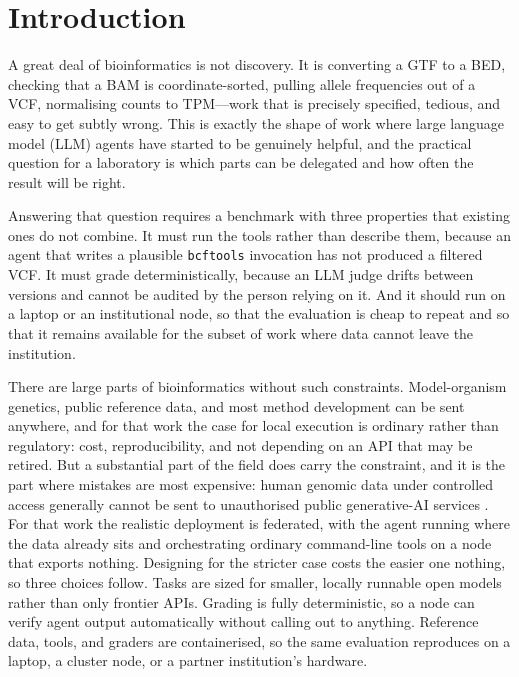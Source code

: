 \documentclass[11pt]{article}
\begin{document}
\section{Introduction}

A great deal of bioinformatics is not discovery.
It is converting a GTF to a BED, checking that a BAM is coordinate-sorted, pulling allele frequencies out of a VCF, normalising counts to TPM---work that is precisely specified, tedious, and easy to get subtly wrong.
This is exactly the shape of work where large language model (LLM) agents have started to be genuinely helpful, and the practical question for a laboratory is which parts can be delegated and how often the result will be right.

Answering that question requires a benchmark with three properties that existing ones do not combine.
It must run the tools rather than describe them, because an agent that writes a plausible \texttt{bcftools} invocation has not produced a filtered VCF.
It must grade deterministically, because an LLM judge drifts between versions and cannot be audited by the person relying on it.
And it should run on a laptop or an institutional node, so that the evaluation is cheap to repeat and so that it remains available for the subset of work where data cannot leave the institution.

There are large parts of bioinformatics without such constraints.
Model-organism genetics, public reference data, and most method development can be sent anywhere, and for that work the case for local execution is ordinary rather than regulatory: cost, reproducibility, and not depending on an API that may be retired.
But a substantial part of the field does carry the constraint, and it is the part where mistakes are most expensive: human genomic data under controlled access generally cannot be sent to unauthorised public generative-AI services \citep{nih2025genomicai}.
For that work the realistic deployment is federated, with the agent running where the data already sits and orchestrating ordinary command-line tools on a node that exports nothing.
Designing for the stricter case costs the easier one nothing, so three choices follow.
Tasks are sized for smaller, locally runnable open models rather than only frontier APIs.
Grading is fully deterministic, so a node can verify agent output automatically without calling out to anything.
Reference data, tools, and graders are containerised, so the same evaluation reproduces on a laptop, a cluster node, or a partner institution's hardware.
\end{document}
